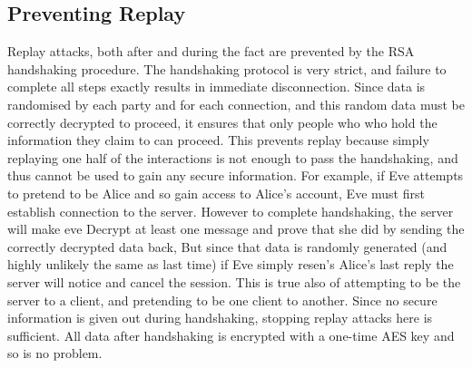 \subsection{Preventing Replay}
Replay attacks, both after and during the fact are prevented by the RSA handshaking procedure.
The handshaking protocol is very strict, and failure to complete all steps exactly results in immediate disconnection.
Since data is randomised by each party and for each connection, and this random data must be correctly decrypted to proceed, it ensures that only people who who hold the information they claim to can proceed.
This prevents replay because simply replaying one half of the interactions is not enough to pass the handshaking, and thus cannot be used to gain any secure information.
For example, if Eve attempts to pretend to be Alice and so gain access to Alice's account, Eve must first establish connection to the server.
However to complete handshaking, the server will make eve Decrypt at least one message and prove that she did by sending the correctly decrypted data back, But since that data is randomly generated (and highly unlikely the same as last time) if Eve simply resen's Alice's last reply the server will notice and cancel the session.
This is true also of attempting to be the server to a client, and pretending to be one client to another.
Since no secure information is given out during handshaking, stopping replay attacks here is sufficient.  All data after handshaking is encrypted with a one-time AES key and so is no problem.



